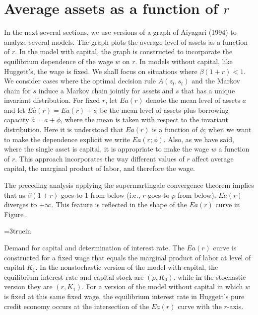 \section{Average assets as a function of $r$}

In the next several sections, we use versions of a graph
of Aiyagari (1994) to analyze several models.  The graph
plots the average level of assets as a function of $r$.
In the model with capital, the graph is constructed to
incorporate the equilibrium dependence of the wage
$w$ on $r$.  In models without capital, like
Huggett's, the wage is fixed.  We shall focus on situations
where $\beta (1+r) < 1$.  We consider cases where
the optimal decision rule $A(z_t, s_t)$ and the Markov chain
for $s$ induce a Markov chain jointly for assets and $s$ that
has a unique invariant distribution.  For fixed $r$, let $E a(r)$
denote the mean level of assets $a$ and let $ E \hat a(r) = E a(r)+\phi$
be the mean level of assets plus borrowing capacity $\hat a = a+\phi$, where the mean is taken
with respect to the invariant distribution.  Here it
is understood that $E a(r)$ is a function of $\phi$; when
we want to make the dependence explicit we write
$Ea(r;\phi)$.  Also, as we have said, where the single
asset is capital, it is appropriate to
make the wage $w$ a function of $r$. This approach incorporates
the way different values of $r$ affect average capital, the
marginal product of labor, and therefore the wage.

The preceding analysis applying the  supermartingale convergence theorem implies
that as $\beta (1+r)$ goes to 1 from below (i.e., $r$ goes
to $\rho$ from below), $Ea (r)$ diverges to $+ \infty$.  This
feature is reflected in the shape of the $E a(r)$ curve
in Figure .


\centerline{\epsfxsize=3truein}
\caption{Demand for capital and determination of interest rate. The $E a(r)$
curve is constructed for a fixed wage that equals the marginal product of labor
at level of capital $K_1$.  In the nonstochastic version of the model with capital,
the equilibrium interest rate and capital stock are $(\rho, K_0)$, while in the
stochastic version they are $(r, K_1)$.  For a version of the model without
capital in which $w$ is fixed at this same fixed wage, the equilibrium interest
rate in Huggett's pure credit economy occurs at the intersection of the $E a(r)$
curve with the $r$-axis.}
\endfigure

